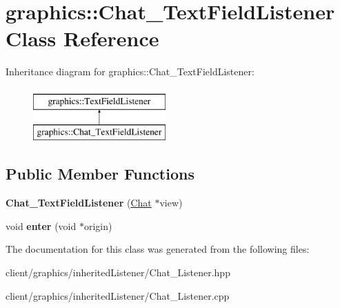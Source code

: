 \hypertarget{classgraphics_1_1_chat___text_field_listener}{\section{graphics\-:\-:Chat\-\_\-\-Text\-Field\-Listener Class Reference}
\label{classgraphics_1_1_chat___text_field_listener}
}
Inheritance diagram for graphics\-:\-:Chat\-\_\-\-Text\-Field\-Listener\-:\begin{figure}[H]
\begin{center}
\leavevmode
\includegraphics[height=2.000000cm]{classgraphics_1_1_chat___text_field_listener}
\end{center}
\end{figure}
\subsection*{Public Member Functions}
\begin{DoxyCompactItemize}
\item 
\hypertarget{classgraphics_1_1_chat___text_field_listener_a435ee0c00a213b8324cb01965f4297a8}{{\bfseries Chat\-\_\-\-Text\-Field\-Listener} (\hyperlink{classgraphics_1_1_chat}{Chat} $\ast$view)}\label{classgraphics_1_1_chat___text_field_listener_a435ee0c00a213b8324cb01965f4297a8}

\item 
\hypertarget{classgraphics_1_1_chat___text_field_listener_ad841baee91a165337c2d15536de281e4}{void {\bfseries enter} (void $\ast$origin)}\label{classgraphics_1_1_chat___text_field_listener_ad841baee91a165337c2d15536de281e4}

\end{DoxyCompactItemize}


The documentation for this class was generated from the following files\-:\begin{DoxyCompactItemize}
\item 
client/graphics/inherited\-Listener/Chat\-\_\-\-Listener.\-hpp\item 
client/graphics/inherited\-Listener/Chat\-\_\-\-Listener.\-cpp\end{DoxyCompactItemize}
